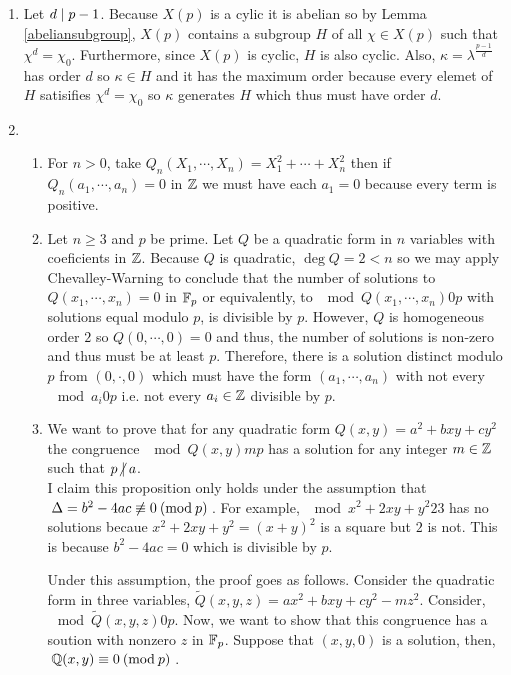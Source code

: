 \documentclass[12pt]{extarticle}
\begin{document}
\begin{enumerate}
\item Let $d \mid p - 1$. Because $X(p)$ is a cylic it is abelian so by Lemma \ref{abeliansubgroup}, $X(p)$ contains a subgroup $H$ of all $\chi \in X(p)$ such that $\chi^d = \chi_0$. Furthermore, since $X(p)$ is cyclic, $H$ is also cyclic. Also, $\kappa = \lambda^{\frac{p-1}{d}}$ has order $d$ so $\kappa \in H$ and it has the maximum order because every elemet of $H$ satisifies $\chi^d = \chi_0$ so $\kappa$ generates $H$ which thus must have order $d$. 

\item

\begin{enumerate}
\item For $n > 0$, take $Q_n(X_1, \cdots, X_n) = X_1^2 + \cdots + X_n^2$ then if $Q_n(a_1, \cdots, a_n) = 0$ in $\mathbb{Z}$ we must have each $a_1 = 0$ because every term is positive. 

\item Let $n \ge 3$ and $p$ be prime. Let $Q$ be a quadratic form in $n$ variables with coeficients in $\mathbb{Z}$. Because $Q$ is quadratic, $\deg{Q} = 2 < n$ so we may apply Chevalley-Warning to conclude that the number of solutions to $Q(x_1, \cdots, x_n) = 0$ in $\mathbb{F}_{p}$ or equivalently, to $\mod{Q(x_1, \cdots, x_n)}{0}{p}$ with solutions equal modulo $p$, is divisible by $p$. However, $Q$ is homogeneous order $2$ so $Q(0, \cdots, 0) = 0$ and thus, the number of solutions is non-zero and thus must be at least $p$. Therefore, there is a solution distinct modulo $p$ from $(0, \cdot, 0)$ which must have the form $(a_1, \cdots, a_n)$ with not every $\mod{a_i}{0}{p}$ i.e. not every $a_i \in \mathbb{Z}$ divisible by $p$.     

\item We want to prove that for any quadratic form $Q(x,y) = a^2 + bxy + cy^2$ the congruence $\mod{Q(x,y)}{m}{p}$ has a solution for any integer $m \in \mathbb{Z}$ such that $p \ndivides a$. \\ 

I claim this proposition only holds under the assumption that $\nmod{\Delta = b^2 - 4ac}{0}{p}$. For example, $\mod{x^2 + 2xy + y^2}{2}{3}$ has no solutions becaue $x^2 + 2xy + y^2 = (x + y)^2$ is a square but $2$ is not. This is because $b^2 - 4ac = 0$ which is divisible by $p$. 

Under this assumption, the proof goes as follows. Consider the quadratic form in three variables, $\tilde{Q}(x,y,z) = a x^2 + bxy + cy^2 - mz^2$. Consider, $\mod{\tilde{Q}(x,y,z)}{0}{p}$. Now, we want to show that this congruence has a soution with nonzero $z$ in $\mathbb{F}_{p}$. Suppose that $(x,y,0)$ is a solution, then, $\: \mathbb{Q}(x,y) \equiv 0 \: (\mathrm{mod} \: p) \:$. \\


\end{enumerate}
\end{enumerate}
\end{document}
